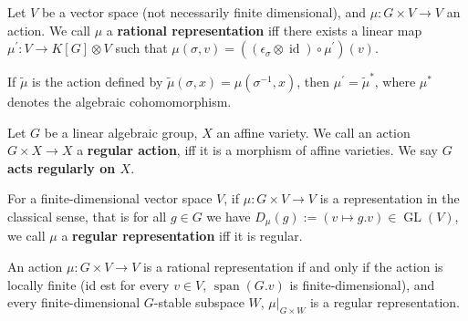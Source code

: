 \begin{definition}\label{rr}
  Let $V$ be a vector space (not necessarily finite dimensional), and $ \mu : G \times V \longrightarrow V $ an action.
  We call $ \mu $ a \textbf{rational representation} iff there exists a linear map $ \mu^\prime \colon V \longrightarrow K[G] \otimes V $ such that $ \mu \left( \sigma , v \right) = \left( \left( \epsilon_\sigma \otimes \operatorname{id} \right) \circ \mu^\prime \right) \left(v\right) $.
\end{definition}

\begin{remark}
  If $\tilde{\mu}$ is the action defined by $ \tilde{\mu} (\sigma,x) = \mu (\sigma^{-1},x)$, then $ \mu^\prime = \tilde{\mu}^\ast $, where $\mu^\ast$ denotes the algebraic cohomomorphism.
\end{remark}

\begin{definition}
  Let $G$ be a linear algebraic group, $X$ an affine variety.
  We call an action $G \times X \longrightarrow X$ a \textbf{regular action}, iff it is a morphism of affine varieties.
  We say \textbf{$ G $ acts regularly on $ X $}.

  For a finite-dimensional vector space $V$, if $\mu \colon G \times V \longrightarrow V$ is a representation in the classical sense, that is for all $g \in G$ we have $D_\mu (g) := (v \mapsto g.v) \in \operatorname{GL}(V)$, we call $\mu$ a \textbf{regular representation} iff it is regular.
  
\end{definition}

\begin{proposition}
  An action $\mu \colon G \times V \longrightarrow V$ is a rational representation if and only if the action is locally finite (id est for every $v \in V$, $\operatorname{span}(G.v)$ is finite-dimensional), and every finite-dimensional $G$-stable subspace $W$, $\left. \mu \right|_{G\times W}$ is a regular representation.
\end{proposition}

